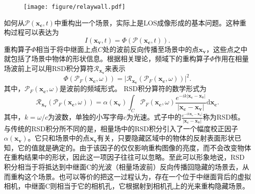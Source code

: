 \documentclass[master]{shtthesis}             %
\begin{document}
\begin{figure}[!tb]
  \centering
  \texttt{[image: figure/relaywall.pdf]}
  \label{fig:rsd_nlos_scene}
\end{figure}

如何从$\mathcal{P}(\mathbf{x_c},t)$中重构出一个场景，实际上是LOS成像形成的基本问题。这种重构过程可以表达为
\begin{equation}\label{eq:recons}
  I(\mathbf{x_v}, t)=\varPhi (\mathcal{P}(\mathbf{x_c},t)).
\end{equation}
重构算子$\varPhi$相当于将中继面上点$C$处的波前反向传播至场景中的点$\mathbf{x_v}$，这些点之中就包括了场景中物体的形状信息。根据相关理论\citep{Teichman2019}，频域下的重构算子$\varPhi$作用在相量场波前上可以用RSD积分算符$\mathcal{R}_{\mathbf{x_v}}$来表示
\begin{equation}\label{eq:recons_freq}
  \varPhi \left( \mathcal{P}_F(\mathbf{x_c},\omega) \right) = \Big| \mathcal{R}_{\mathbf{x_v}} \left( \mathcal{P}_F(\mathbf{x_c},\omega) \right) \Big|^2.
\end{equation}
其中，$\mathcal{P}_F(\mathbf{x_c},\omega)$是波前的频域形式。
RSD积分算符的数学形式为
\begin{equation}\label{eq:rsdint}
  \mathcal{R}_{\mathbf{x_v}} \left( \mathcal{P}_F(\mathbf{x_c},\omega) \right) = \alpha(\mathbf{x_v}) \int_C \mathcal{P}_F(\mathbf{x_c},\omega) \frac{e^{-ik|\mathbf{x_c}-\mathbf{x_v}|}}{|\mathbf{x_c}-\mathbf{x_v}|}\text{d} \mathbf{x_c} .
\end{equation}
其中，$k=\omega/c$为波数，单独的小写字母$c$为光速。式子中的$\frac{e^{-ik\mathbf{x_c}-\mathbf{x_v}|}}{|\mathbf{x_c}-\mathbf{x_v}|}$称为RSD核。与传统的RSD积分所不同的是，相量场中的RSD积分引入了一个幅度校正因子$\alpha(\mathbf{x_v})$。它只和场景中的点$\mathbf{x_v}$有关，只要隐藏区域中的物体的反射表面形状已知，它的值就是确定的。由于该因子的仅仅影响重构图像的亮度，而不会改变物体在重构结果中的形状，因此这一项因子往往可以忽略。至此可以形象地说，RSD积分相当于将抵达到中继面C的光波（相量场波前）反向传播回隐藏的场景去，从而重构这个场景。也可以等价的把这一过程认为，存在一个位于中继面背后的虚拟相机，中继面C则相当于它的相机孔，它根据射到相机孔上的光来重构隐藏场景。
\end{document}
